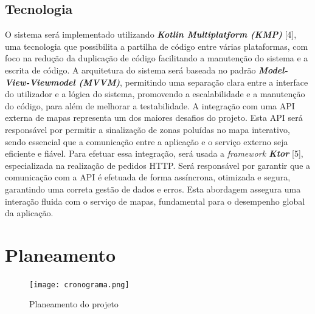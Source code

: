 \documentclass[a4paper,11pt]{article}
\begin{document}
\subsection{Tecnologia}
O sistema será implementado utilizando \textit{\textbf{Kotlin Multiplatform (KMP)}} [4], uma tecnologia que possibilita a partilha de código entre várias plataformas, com foco na redução da duplicação de código facilitando a manutenção do sistema e a escrita de código. A arquitetura do sistema será baseada no padrão \textit{\textbf{Model-View-Viewmodel (MVVM)}}, permitindo uma separação clara entre a interface do utilizador e a lógica do sistema, promovendo a escalabilidade e a manutenção do código, para além de melhorar a testabilidade.
A integração com uma API externa de mapas representa um dos maiores desafios do projeto. Esta API será responsável por permitir a sinalização de zonas poluídas no mapa interativo, sendo essencial que a comunicação entre a aplicação e o serviço externo seja eficiente e fiável. 
Para efetuar essa integração, será usada a \textit{framework \textbf{Ktor}} [5], especializada na realização de pedidos HTTP. Será responsável por garantir que a comunicação com a API é efetuada de forma assíncrona, otimizada e segura, garantindo uma correta gestão de dados e erros. Esta abordagem assegura uma interação fluida com o serviço de mapas, fundamental para o desempenho global da aplicação.

\section{Planeamento}
\begin{figure}[H]
    \centering
    \texttt{[image: cronograma.png]}
    \caption{Planeamento do projeto}
    \label{fig:usecase}
\end{figure}
\end{document}
